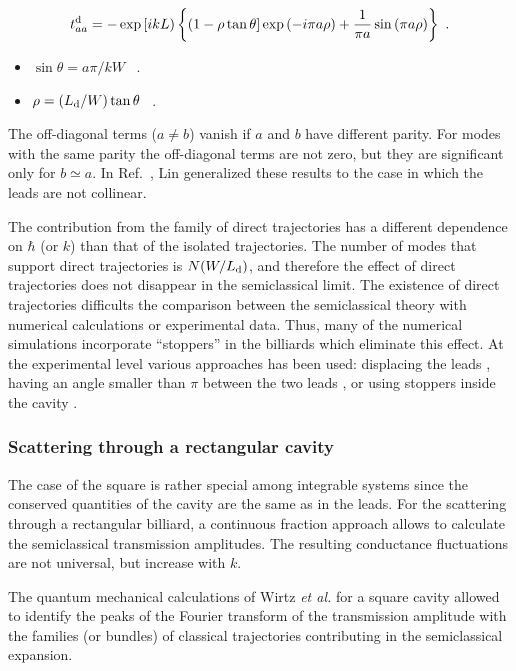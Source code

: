 \documentclass[a4paper,10pt]{article}
\newcommand{\nin}{\noindent}
\newcommand{\be}{\begin{equation}}
\newcommand{\ee}{\end{equation}}
\newcommand{\LD}{L_{\rm d}}
\begin{document}
\be
t^{\rm d}_{aa}= - \exp{\left[i k L\right)} \left\{\left(1-\rho\tan{\theta}\right] \exp{\left(-i \pi a \rho \right)} + \frac{1}{\pi a} \sin{\left(\pi a \rho \right)}\right\} \ .
\label{tdjj2}
\ee

\begin{itemize}

\item $\sin{\theta} = a\pi/ kW$ \ .

\item $\rho=(\LD/W)\tan{\theta}$ \ .

\end{itemize}

\nin The off-diagonal terms ($a \neq b$) vanish if $a$ and $b$ have different parity. For modes with the same parity the off-diagonal terms are not zero, but they are significant only for $b \simeq a$. In Ref.~\cite{LinJen}, Lin generalized these results to the case in which the leads are not collinear.

\nin The contribution from the family of direct trajectories has a different dependence on $\hbar$ (or $k$) than that of the isolated trajectories. The number of modes that support direct trajectories is $N(W/\LD)$, and therefore the effect of direct trajectories does not disappear in the semiclassical limit. The existence of direct trajectories difficults
the comparison between the semiclassical theory with numerical calculations or experimental data. Thus, many of the numerical simulations incorporate ``stoppers'' in the billiards which eliminate this effect. At the experimental level various approaches has been used: displacing the leads \cite{Kel94}, having an angle smaller than $\pi$ between the two leads \cite{Mar92,marcusgroup3}, or using stoppers inside the cavity \cite{Kel94,lee97}. 

\subsubsection{Scattering through a rectangular cavity}
\label{subsubsec:starc}

\nin The case of the square is rather special among integrable
systems since the conserved quantities of the cavity are the same as in 
the leads. For the scattering through a rectangular billiard, a continuous
fraction approach \cite{paul} allows to calculate the semiclassical transmission amplitudes. The resulting conductance fluctuations are not universal, but increase with $k$. 

\nin The quantum mechanical calculations of Wirtz {\em et al.} \cite{Wirtz} for a square cavity allowed to identify the peaks of the Fourier transform of the transmission amplitude with the families (or bundles)
of classical trajectories contributing in the semiclassical expansion.
\end{document}
